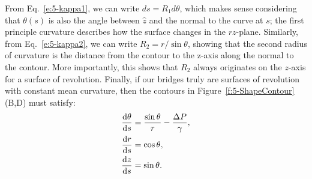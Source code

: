 From Eq.~\ref{e:5-kappa1}, we can write $ds = R_1 d\theta$, which makes sense considering that $\theta(s)$ is also the angle between $\hat{z}$ and the normal to the curve at $s$; the first principle curvature describes how the surface changes in the $rz$-plane.
Similarly, from Eq.~\ref{e:5-kappa2}, we can write $R_2 = r/\sin\theta$, showing that the second radius of curvature is the distance from the contour to the z-axis along the normal to the contour.
More importantly, this shows that $R_2$ always originates on the $z$-axis for a surface of revolution.
Finally, if our bridges truly are surfaces of revolution with constant mean curvature, then the contours in Figure~\ref{f:5-ShapeContour}(B,D) must satisfy:
\begin{align}
  \frac{\textrm{d}\theta}{\textrm{d}s} &= \frac{\sin \theta}{r} - \frac{\Delta P}{\gamma},\label{e:5-ShapeSolveA} \\
  \frac{{\rm d}r}{{\rm d}s} &= \cos \theta, \\
  \frac{{\rm d}{z}}{{\rm d}s} &= \sin \theta.\label{e:5-ShapeSolveC}
\end{align}

